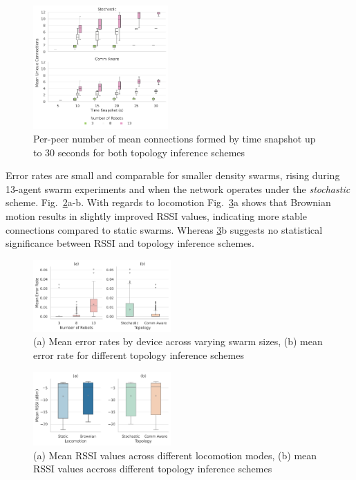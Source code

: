 \documentclass[conference]{IEEEtran}
\begin{document}
\begin{figure}[h]
    \centering
    \includegraphics[width=0.46\textwidth]{unique_connections.pdf}
    \caption{Per-peer number of mean connections formed by time snapshot up to 30 seconds for both topology inference schemes}
    \label{fig:unique-connections}
\end{figure}

Error rates are small and comparable for smaller density swarms, rising during 13-agent swarm experiments and when the network operates under the \emph{stochastic} scheme. Fig.~\ref{fig:error-rates}a-b. With regards to locomotion Fig.~\ref{fig:rssi}a shows that Brownian motion results in slightly improved RSSI values, indicating more stable connections compared to static swarms. Whereas \ref{fig:rssi}b suggests no statistical significance between RSSI and topology inference schemes. \\

\begin{figure}[h]
    \centering
    \includegraphics[width=0.47\textwidth]{reliability_impact.pdf}
    \caption{(a) Mean error rates by device across varying swarm sizes, (b) mean error rate for different topology inference schemes}
    \label{fig:error-rates}
\end{figure}

\begin{figure}[h]
    \centering
    \includegraphics[width=0.47\textwidth]{speed_impact.pdf}
    \caption{(a) Mean RSSI values across different locomotion modes, (b) mean RSSI values accross different topology inference schemes}
    \label{fig:rssi}
\end{figure}
\end{document}
